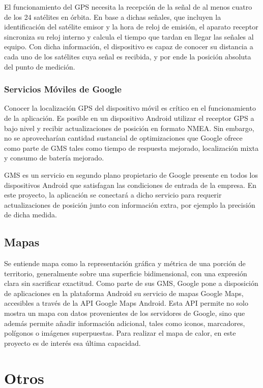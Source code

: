 El funcionamiento del \ac{GPS} necesita la recepción de la señal de al menos cuatro de los 24 satélites en órbita. En base a dichas señales, que incluyen la identificación del satélite emisor y la hora de reloj de emisión, el aparato receptor sincroniza su reloj interno y calcula el tiempo que tardan en llegar las señales al equipo. Con dicha información, el dispositivo es capaz de conocer su distancia a cada uno de los satélites cuya señal es recibida, y por ende la posición absoluta del punto de medición.

\subsubsection{Servicios Móviles de Google}
Conocer la localización \ac{GPS} del dispositivo móvil es crítico en el funcionamiento de la aplicación. Es posible en un dispositivo Android utilizar el receptor \ac{GPS} a bajo nivel y recibir actualizaciones de posición en formato NMEA. Sin embargo, no se aprovecharían cantidad sustancial de optimizaciones que Google ofrece como parte de \ac{GMS} tales como tiempo de respuesta mejorado, localización mixta y consumo de batería mejorado. 

\ac{GMS} es un servicio en segundo plano propietario de Google presente en todos los dispositivos Android que satisfagan las condiciones de entrada de la empresa. En este proyecto, la aplicación se conectará a dicho servicio para requerir actualizaciones de posición junto con información extra, por ejemplo la precisión de dicha medida.

\subsection{Mapas}
    Se entiende mapa como la representación gráfica y métrica de una porción de territorio, generalmente sobre una superficie bidimensional, con una expresión clara sin sacrificar exactitud.
    Como parte de sus \ac{GMS}, Google pone a disposición de aplicaciones en la plataforma Android su servicio de mapas Google Maps, accesibles a través de la \ac{API} Google Maps Android. Esta \ac{API} permite no solo mostra un mapa con datos provenientes de los servidores de Google, sino que además permite añadir información adicional, tales como iconos, marcadores, polígonos o imágenes superpuestas. Para realizar el mapa de calor, en este proyecto es de interés esa última capacidad. 
\section{Otros}

